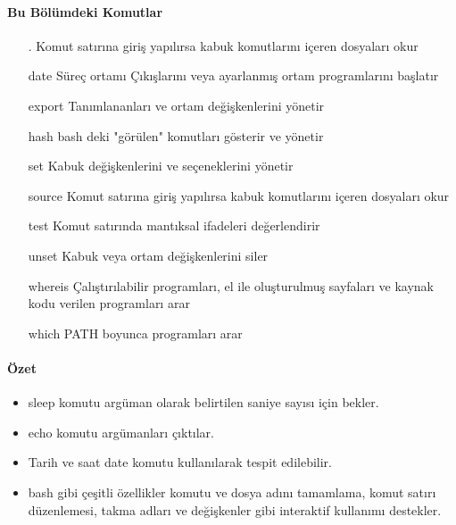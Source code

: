 \paragraph{Bu Bölümdeki Komutlar}{
\begin{itemize}
\item[.]Komut satırına giriş yapılırsa kabuk komutlarını içeren dosyaları okur
\item[date]Süreç ortamı Çıkışlarını veya ayarlanmış ortam programlarını başlatır
\item[export]Tanımlananları ve ortam değişkenlerini yönetir
\item[hash]bash deki "görülen" komutları gösterir ve yönetir
\item[set]Kabuk değişkenlerini ve seçeneklerini yönetir
\item[source]Komut satırına giriş yapılırsa kabuk komutlarını içeren dosyaları okur
\item[test]Komut satırında mantıksal ifadeleri değerlendirir
\item[unset]Kabuk veya ortam değişkenlerini siler
\item[whereis]Çalıştırılabilir programları, el ile oluşturulmuş sayfaları ve kaynak kodu verilen programları arar
\item[which]PATH boyunca programları arar
\end{itemize}}

\paragraph{Özet}{
\begin{itemize}
\item sleep komutu argüman olarak belirtilen saniye sayısı için bekler.
\item echo komutu argümanları çıktılar.
\item Tarih ve saat date komutu kullanılarak tespit edilebilir.
\item bash gibi çeşitli özellikler komutu ve dosya adını tamamlama, komut satırı düzenlemesi, takma adları ve değişkenler gibi interaktif kullanımı destekler.
\end{itemize}
}